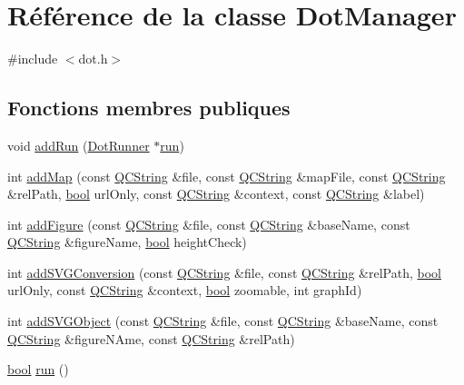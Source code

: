 \hypertarget{class_dot_manager}{}\section{Référence de la classe Dot\+Manager}
\label{class_dot_manager}


{\ttfamily \#include $<$dot.\+h$>$}

\subsection*{Fonctions membres publiques}
\begin{DoxyCompactItemize}
\item 
void \hyperlink{class_dot_manager_a738dc3b3bdbcc60b802db0ccd43c6f84}{add\+Run} (\hyperlink{class_dot_runner}{Dot\+Runner} $\ast$\hyperlink{class_dot_manager_a3b34d4c3e0ab9e9debe6c7fa45a129bb}{run})
\item 
int \hyperlink{class_dot_manager_a00e00b1956a2b2b6477d9af428c300c2}{add\+Map} (const \hyperlink{class_q_c_string}{Q\+C\+String} \&file, const \hyperlink{class_q_c_string}{Q\+C\+String} \&map\+File, const \hyperlink{class_q_c_string}{Q\+C\+String} \&rel\+Path, \hyperlink{qglobal_8h_a1062901a7428fdd9c7f180f5e01ea056}{bool} url\+Only, const \hyperlink{class_q_c_string}{Q\+C\+String} \&context, const \hyperlink{class_q_c_string}{Q\+C\+String} \&label)
\item 
int \hyperlink{class_dot_manager_af84ce8e355f7971a4a8869993d7d0181}{add\+Figure} (const \hyperlink{class_q_c_string}{Q\+C\+String} \&file, const \hyperlink{class_q_c_string}{Q\+C\+String} \&base\+Name, const \hyperlink{class_q_c_string}{Q\+C\+String} \&figure\+Name, \hyperlink{qglobal_8h_a1062901a7428fdd9c7f180f5e01ea056}{bool} height\+Check)
\item 
int \hyperlink{class_dot_manager_adf754e666617a77c8aed10ccc90a3860}{add\+S\+V\+G\+Conversion} (const \hyperlink{class_q_c_string}{Q\+C\+String} \&file, const \hyperlink{class_q_c_string}{Q\+C\+String} \&rel\+Path, \hyperlink{qglobal_8h_a1062901a7428fdd9c7f180f5e01ea056}{bool} url\+Only, const \hyperlink{class_q_c_string}{Q\+C\+String} \&context, \hyperlink{qglobal_8h_a1062901a7428fdd9c7f180f5e01ea056}{bool} zoomable, int graph\+Id)
\item 
int \hyperlink{class_dot_manager_a68003377d30caae4e674bd3b4b8f2899}{add\+S\+V\+G\+Object} (const \hyperlink{class_q_c_string}{Q\+C\+String} \&file, const \hyperlink{class_q_c_string}{Q\+C\+String} \&base\+Name, const \hyperlink{class_q_c_string}{Q\+C\+String} \&figure\+N\+Ame, const \hyperlink{class_q_c_string}{Q\+C\+String} \&rel\+Path)
\item 
\hyperlink{qglobal_8h_a1062901a7428fdd9c7f180f5e01ea056}{bool} \hyperlink{class_dot_manager_a3b34d4c3e0ab9e9debe6c7fa45a129bb}{run} ()
\end{DoxyCompactItemize}
